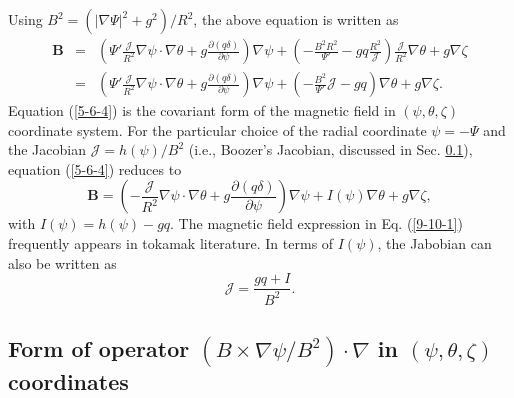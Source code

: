 \documentclass{article}
\begin{document}
Using $B^2 = (| \nabla \Psi |^2 + g^2) / R^2$, the above equation is written
as
\begin{eqnarray}
  \mathbf{B} & = & \left( \Psi' \frac{\mathcal{J}}{R^2} \nabla \psi \cdot
  \nabla \theta + g \frac{\partial (q \delta)}{\partial \psi} \right) \nabla
  \psi + \left( - \frac{B^2 R^2}{\Psi'} - g q \frac{R^2}{\mathcal{J}} \right)
  \frac{\mathcal{J}}{R^2} \nabla \theta + g \nabla \zeta \nonumber\\
  & = & \left( \Psi' \frac{\mathcal{J}}{R^2} \nabla \psi \cdot \nabla \theta
  + g \frac{\partial (q \delta)}{\partial \psi} \right) \nabla \psi + \left( -
  \frac{B^2}{\Psi'} \mathcal{J}- g q \right) \nabla \theta + g \nabla \zeta . 
  \label{5-6-4}
\end{eqnarray}
Equation (\ref{5-6-4}) is the covariant form of the magnetic field in $(\psi,
\theta, \zeta)$ coordinate system. For the particular choice of the radial
coordinate $\psi = - \Psi$ and the Jacobian $\mathcal{J}= h (\psi) / B^2$
(i.e., Boozer's Jacobian, discussed in Sec. \ref{18-5-1-p1}), equation
(\ref{5-6-4}) reduces to
\begin{equation}
  \label{9-10-1} \mathbf{B}= \left( - \frac{\mathcal{J}}{R^2} \nabla \psi
  \cdot \nabla \theta + g \frac{\partial (q \delta)}{\partial \psi} \right)
  \nabla \psi + I (\psi) \nabla \theta + g \nabla \zeta,
\end{equation}
with $I (\psi) = h (\psi) - g q$. The magnetic field expression in Eq.
(\ref{9-10-1}) frequently appears in tokamak literature{\cite{white1984}}. In
terms of $I (\psi)$, the Jabobian can also be written as
\begin{equation}
  \mathcal{J} = \frac{g q + I}{B^2} .
\end{equation}
\subsection{Form of operator $(B \times \nabla \psi / B^2) \cdot \nabla$ in
$(\psi, \theta, \zeta)$ coordinates}\label{18-5-1-p1}
\end{document}
